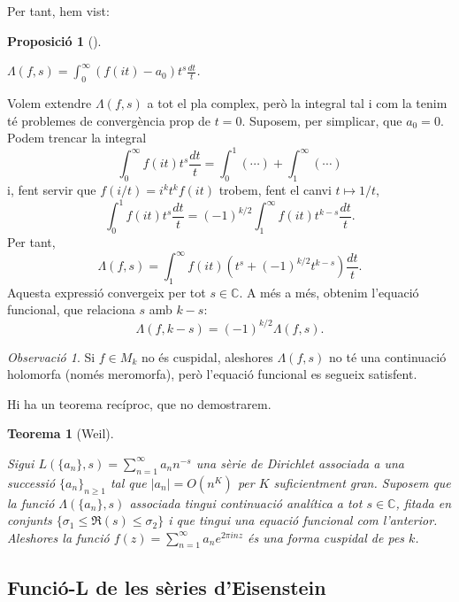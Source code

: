 \documentclass[
  letterpaper,
  DIV=11,
  numbers=noendperiod]{scrreprt}
\theoremstyle{plain}
\newtheorem{theorem}{Teorema}[chapter]
\theoremstyle{plain}
\theoremstyle{definition}
\theoremstyle{plain}
\newtheorem{proposition}{Proposició}[chapter]
\theoremstyle{plain}
\theoremstyle{definition}
\theoremstyle{remark}
\newtheorem{refremark}{Observació}[chapter]
\begin{document}
Per tant, hem vist:

\begin{proposition}[]\protect\hypertarget{prp-}{}\label{prp-}

\(\Lambda(f,s) = \int_0^\infty (f(it) - a_0)t^s\frac{dt}{t}\).

\end{proposition}

Volem extendre \(\Lambda(f,s)\) a tot el pla complex, però la integral
tal i com la tenim té problemes de convergència prop de \(t=0\).
Suposem, per simplicar, que \(a_0=0\). Podem trencar la integral \[
\int_0^\infty f(it)t^{s}\frac{dt}{t} = \int_0^1(\cdots)+\int_1^\infty(\cdots)
\] i, fent servir que \(f(i/t) = i^kt^kf(it)\) trobem, fent el canvi
\(t\mapsto 1/t\), \[
\int_0^1  f(it)t^{s}\frac{dt}{t} = (-1)^{k/2} \int_1^\infty f(it)t^{k-s}\frac{dt}{t}.
\] Per tant, \[
\Lambda(f,s) = \int_1^\infty f(it) (t^s + (-1)^{k/2} t^{k-s})\frac{dt}{t}.
\] Aquesta expressió convergeix per tot \(s\in\mathbb{C}\). A més a més,
obtenim l'equació funcional, que relaciona \(s\) amb \(k-s\): \[
\Lambda(f,k-s) = (-1)^{k/2} \Lambda(f,s).
\]

\begin{refremark}
Si \(f\in M_k\) no és cuspidal, aleshores \(\Lambda(f,s)\) no té una
continuació holomorfa (només meromorfa), però l'equació funcional es
segueix satisfent.

\label{rem-}

\end{refremark}

Hi ha un teorema recíproc, que no demostrarem.

\begin{theorem}[Weil]\protect\hypertarget{thm-Weil}{}\label{thm-Weil}

Sigui \(L(\{a_n\},s) = \sum_{n=1}^\infty a_n n^{-s}\) una sèrie de
Dirichlet associada a una successió \(\{a_n\}_{n\geq 1}\) tal que
\(|a_n|=O(n^K)\) per \(K\) suficientment gran. Suposem que la funció
\(\Lambda(\{a_n\},s)\) associada tingui continuació analítica a tot
\(s\in\mathbb{C}\), fitada en conjunts
\(\{\sigma_1\leq \Re(s)\leq \sigma_2\}\) i que tingui una equació
funcional com l'anterior. Aleshores la funció
\(f(z)=\sum_{n=1}^\infty a_ne^{2\pi inz}\) és una forma cuspidal de pes
\(k\).

\end{theorem}

\subsection{Funció-L de les sèries
d'Eisenstein}\label{funciuxf3-l-de-les-suxe8ries-deisenstein}
\end{document}
